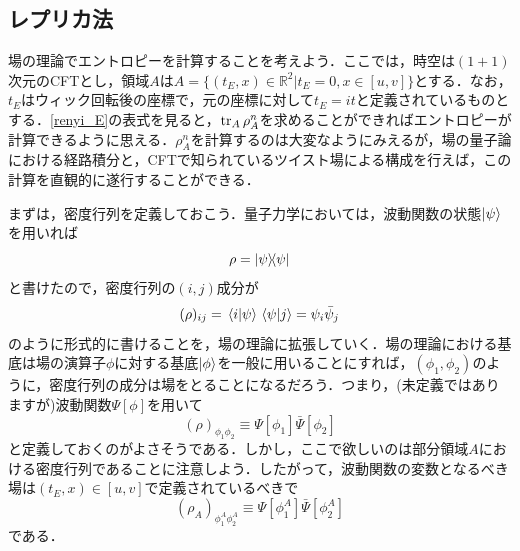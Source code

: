 \documentclass[a4paper,uplatex,dvipdfmx]{jsarticle}
\theoremstyle{definition}
\begin{document}
\subsection{レプリカ法}

場の理論でエントロピーを計算することを考えよう．ここでは，時空は$(1+1)$次元のCFTとし，領域$A$は$A=\{(t_{E},x)\in\mathbb{R}^2|t_{E}=0,x\in[u,v]\}$とする．なお，$t_E$はウィック回転後の座標で，元の座標に対して$t_E=it$と定義されているものとする．\eqref{renyi_E}の表式を見ると，$\tr_{A}\rho_{A}^{n}$を求めることができればエントロピーが計算できるように思える．$\rho_{A}^{n}$を計算するのは大変なようにみえるが，場の量子論における経路積分と，CFTで知られているツイスト場による構成を行えば，この計算を直観的に遂行することができる．

まずは，密度行列を定義しておこう．量子力学においては，波動関数の状態$\ket{\psi}$を用いれば
\begin{equation}
  \rho
  =
  \ketbra{\psi}{\psi}
\end{equation}
と書けたので，密度行列の$(i,j)$成分が
\begin{equation}
  (\rho)_{ij}
  =
  \ev*{i|\psi}\ev*{\psi|j}
  =
  \psi_{i}\bar{\psi}_{j}
\end{equation}
のように形式的に書けることを，場の理論に拡張していく．場の理論における基底は場の演算子$\phi$に対する基底$\ket{\phi}$を一般に用いることにすれば，$(\phi_1,\phi_2)$のように，密度行列の成分は場をとることになるだろう．つまり，(未定義ではありますが)波動関数$\Psi[\phi]$を用いて
\begin{equation}
  (\rho)_{\phi_1\phi_2}
  \equiv
  \Psi[\phi_1]\bar{\Psi}[\phi_2]
\end{equation}
と定義しておくのがよさそうである．しかし，ここで欲しいのは部分領域$A$における密度行列であることに注意しよう．したがって，波動関数の変数となるべき場は$(t_E,x)\in[u,v]$で定義されているべきで
\begin{equation}
  (\rho_{A})_{\phi^{A}_{1}\phi^{A}_{2}}
  \equiv
  \Psi[\phi^{A}_1]\bar{\Psi}[\phi^{A}_2]
  \label{density_matrix_A}
\end{equation}
である．
\end{document}
